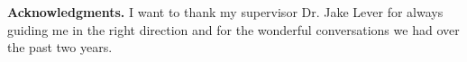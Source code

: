 {\bf Acknowledgments.}
I want to thank my supervisor Dr. Jake Lever for always guiding me in the right direction and for the wonderful conversations we had over the past two years.